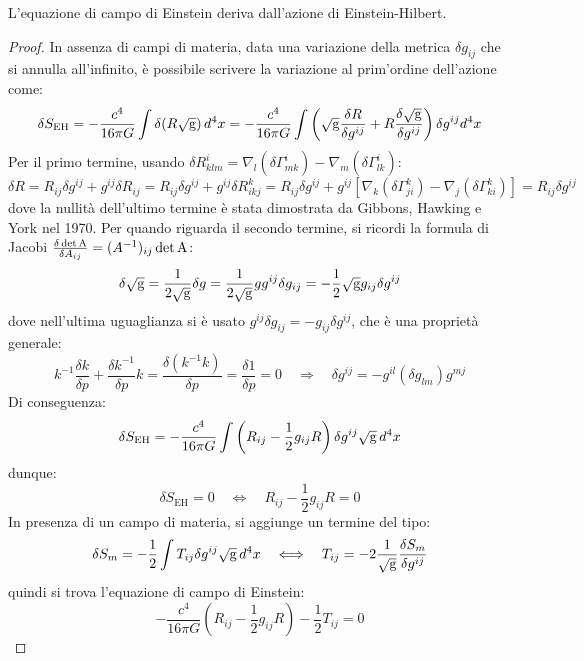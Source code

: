 \begin{proposition}
	L'equazione di campo di Einstein deriva dall'azione di Einstein-Hilbert.
\end{proposition}
\begin{proof}
	In assenza di campi di materia, data una variazione della metrica $ \delta g_{ij} $ che si annulla all'infinito, è possibile scrivere la variazione al prim'ordine dell'azione come:
	\begin{equation*}
		\delta S_{\text{EH}} = - \frac{c^4}{16\pi G} \int \delta (R\sqrt{\mathrm{g}}) \,d^4x = - \frac{c^4}{16\pi G} \int \left( \sqrt{\mathrm{g}} \frac{\delta R}{\delta g^{ij}} + R \frac{\delta \sqrt{\mathrm{g}}}{\delta g^{ij}} \right) \delta g^{ij} d^4x
	\end{equation*}
	Per il primo termine, usando $ \delta R^i_{klm} = \nabla_l (\delta \Gamma^i_{mk}) - \nabla_m (\delta \Gamma^i_{lk}) $:
	\begin{equation*}
		\delta R = R_{ij} \delta g^{ij} + g^{ij} \delta R_{ij} = R_{ij} \delta g^{ij} + g^{ij} \delta R^k_{ikj} = R_{ij} \delta g^{ij} + g^{ij} \left[ \nabla_k (\delta \Gamma^k_{ji}) - \nabla_j (\delta \Gamma^k_{ki}) \right] = R_{ij} \delta g^{ij}
	\end{equation*}
	dove la nullità dell'ultimo termine è stata dimostrata da Gibbons, Hawking e York nel 1970. Per quando riguarda il secondo termine, si ricordi la formula di Jacobi $ \frac{\delta \det \mathrm{A}}{\delta A_{ij}} = (A^{-1})_{ij} \det \mathrm{A} $:
	\begin{equation*}
		\delta \sqrt{\mathrm{g}} = \frac{1}{2\sqrt{\mathrm{g}}} \delta g = \frac{1}{2\sqrt{\mathrm{g}}} g g^{ij} \delta g_{ij} = - \frac{1}{2} \sqrt{\mathrm{g}} g_{ij} \delta g^{ij}
	\end{equation*}
	dove nell'ultima uguaglianza si è usato $ g^{ij} \delta g_{ij} = - g_{ij} \delta g^{ij} $, che è una proprietà generale:
	\begin{equation*}
		k^{-1} \frac{\delta k}{\delta p} + \frac{\delta k^{-1}}{\delta p} k = \frac{\delta (k^{-1} k)}{\delta p} = \frac{\delta 1}{\delta p} = 0 \quad\Longrightarrow\quad \delta g^{ij} = - g^{il} (\delta g_{lm}) g^{mj}
	\end{equation*}
	Di conseguenza:
	\begin{equation*}
		\delta S_{\text{EH}} = - \frac{c^4}{16\pi G} \int \left( R_{ij} - \frac{1}{2} g_{ij} R \right) \delta g^{ij} \sqrt{\mathrm{g}} \,d^4x
	\end{equation*}
	dunque:
	\begin{equation*}
		\delta S_{\text{EH}} = 0 \quad\Longleftrightarrow\quad R_{ij} - \frac{1}{2} g_{ij} R = 0
	\end{equation*}
	In presenza di un campo di materia, si aggiunge un termine del tipo:
	\begin{equation*}
		\delta S_m = - \frac{1}{2} \int T_{ij} \delta g^{ij} \sqrt{\mathrm{g}} \,d^4x \quad\Longleftrightarrow\quad T_{ij} = - 2 \frac{1}{\sqrt{\mathrm{g}}} \frac{\delta S_m}{\delta g^{ij}}
	\end{equation*}
	quindi si trova l'equazione di campo di Einstein:
	\begin{equation*}
		- \frac{c^4}{16\pi G} \left( R_{ij} - \frac{1}{2} g_{ij} R \right) - \frac{1}{2} T_{ij} = 0
	\end{equation*}
\end{proof}










